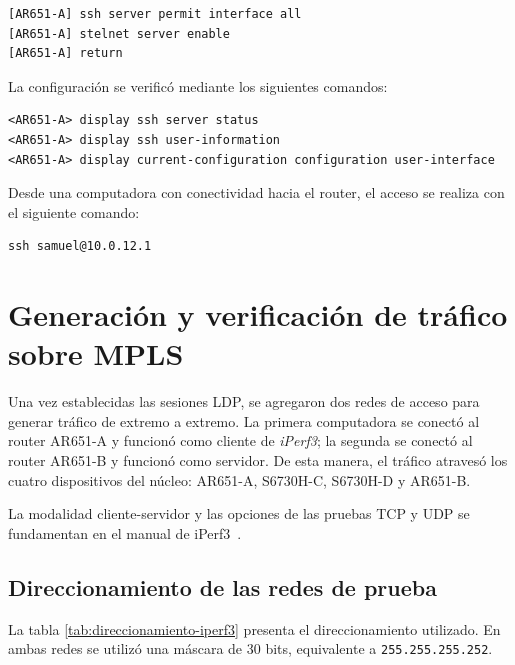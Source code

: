\begin{lstlisting}[style=terminal]
[AR651-A] ssh server permit interface all
[AR651-A] stelnet server enable
[AR651-A] return
\end{lstlisting}

La configuración se verificó mediante los siguientes comandos:

\begin{lstlisting}[style=terminal]
<AR651-A> display ssh server status
<AR651-A> display ssh user-information
<AR651-A> display current-configuration configuration user-interface
\end{lstlisting}

Desde una computadora con conectividad hacia el router, el acceso se realiza
con el siguiente comando:

\begin{lstlisting}[style=terminal]
ssh samuel@10.0.12.1
\end{lstlisting}
\section{Generación y verificación de tráfico sobre MPLS}

\label{sec:pruebas-mpls-iperf3}

Una vez establecidas las sesiones LDP, se agregaron dos redes de acceso para
generar tráfico de extremo a extremo. La primera computadora se conectó al
router AR651-A y funcionó como cliente de \textit{iPerf3}; la segunda se
conectó al router AR651-B y funcionó como servidor. De esta manera, el
tráfico atravesó los cuatro dispositivos del núcleo: AR651-A, S6730H-C,
S6730H-D y AR651-B.

La modalidad cliente-servidor y las opciones de las pruebas TCP y UDP se
fundamentan en el manual de iPerf3~\cite{esnet-iperf3-manual}.

\subsection{Direccionamiento de las redes de prueba}

La tabla \ref{tab:direccionamiento-iperf3} presenta el direccionamiento
utilizado. En ambas redes se utilizó una máscara de 30 bits, equivalente a
\texttt{255.255.255.252}.

